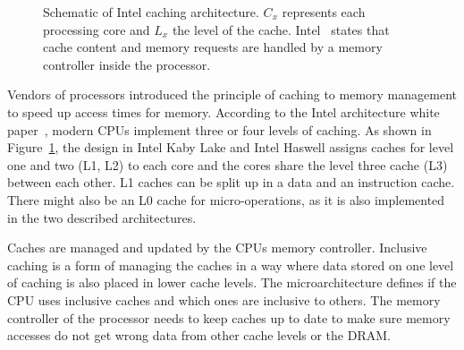 \begin{figure}[!htb]
  \centering
  \caption{Schematic of Intel caching architecture. $C_x$ represents each
processing core and $L_x$ the level of the cache. Intel~\cite{intelwhite}
states that cache content and memory requests are handled by a memory
controller inside the processor.}
\label{fig:intelcache}
\end{figure}

Vendors of processors introduced the principle of caching to memory management
to speed up access times for memory. According to the Intel architecture white
paper~\cite{intelwhite}, modern CPUs implement three or four levels of caching.
As shown in Figure~\ref{fig:intelcache}, the design in Intel Kaby Lake and Intel
Haswell assigns caches for level one and two (L1, L2) to each core and the cores
share the level three cache (L3) between each other. L1 caches can be split up
in a data and an instruction cache. There might also be an L0 cache for
micro-operations, as it is also implemented in the two described architectures.

Caches are managed and updated by the CPU\textquotesingle s memory controller.
Inclusive caching is a form of managing the caches in a way where data stored on
one level of caching is also placed in lower cache levels. The microarchitecture
defines if the CPU uses inclusive caches and which ones are inclusive to others.
The memory controller of the processor needs to keep caches up to date to make
sure memory accesses do not get wrong data from other cache levels or the DRAM.

